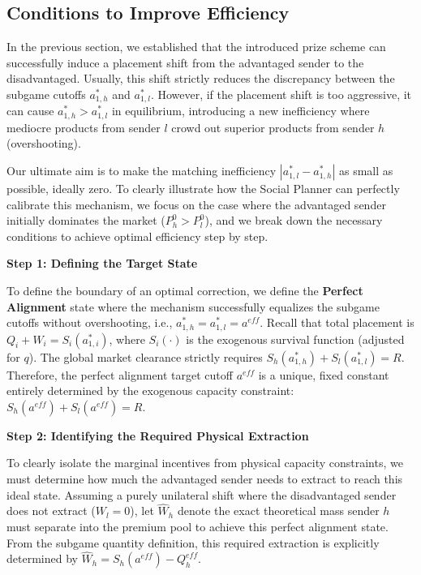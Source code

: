 \documentclass[12pt, a4paper]{article}
\begin{document}
\subsection{Conditions to Improve Efficiency}

In the previous section, we established that the introduced prize scheme can successfully induce a placement shift from the advantaged sender to the disadvantaged. Usually, this shift strictly reduces the discrepancy between the subgame cutoffs $a^*_{1, h}$ and $a^*_{1, l}$. However, if the placement shift is too aggressive, it can cause $a^*_{1, h} > a^*_{1, l}$ in equilibrium, introducing a new inefficiency where mediocre products from sender $l$ crowd out superior products from sender $h$ (overshooting). 

Our ultimate aim is to make the matching inefficiency $|a^*_{1, l}-a^*_{1, h}|$ as small as possible, ideally zero. To clearly illustrate how the Social Planner can perfectly calibrate this mechanism, we focus on the case where the advantaged sender initially dominates the market ($P_h^0 > P_l^0$), and we break down the necessary conditions to achieve optimal efficiency step by step.

\textbf{Step 1: Defining the Target State}

To define the boundary of an optimal correction, we define the \textbf{Perfect Alignment} state where the mechanism successfully equalizes the subgame cutoffs without overshooting, i.e., $a^*_{1,h} = a^*_{1,l} = a^{eff}$. 
Recall that total placement is $Q_i + W_i = S_i(a_{1,i}^*)$, where $S_i(\cdot)$ is the exogenous survival function (adjusted for $q$). The global market clearance strictly requires $S_h(a_{1,h}^*) + S_l(a_{1,l}^*) = R$. Therefore, the perfect alignment target cutoff $a^{eff}$ is a unique, fixed constant entirely determined by the exogenous capacity constraint: $S_h(a^{eff}) + S_l(a^{eff}) = R$.

\textbf{Step 2: Identifying the Required Physical Extraction}

To clearly isolate the marginal incentives from physical capacity constraints, we must determine how much the advantaged sender needs to extract to reach this ideal state. Assuming a purely unilateral shift where the disadvantaged sender does not extract ($W_l = 0$), let $\hat{W}_h$ denote the exact theoretical mass sender $h$ must separate into the premium pool to achieve this perfect alignment state. From the subgame quantity definition, this required extraction is explicitly determined by $\hat{W}_h = S_h(a^{eff}) - Q_h^{eff}$.
\end{document}
